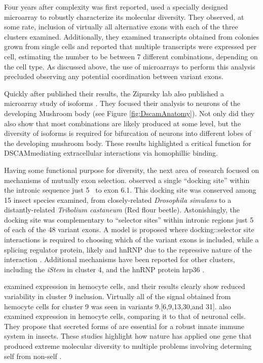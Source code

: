Four years after \dscam{} complexity was first reported, \citep{Neves2004} used a specially designed microarray to robustly characterize its molecular diversity. They observed, at some rate, inclusion of virtually all alternative exons with each of the three clusters examined. Additionally, they examined \dscam{} transcripts obtained from colonies grown from single cells and reported that multiple \dscam{} transcripts were expressed per cell, estimating the number to be between 7 different combinations, depending on the cell type. As discussed above, the use of microarrays to perform this analysis precluded observing any potential coordination between variant exons.

Quickly after \citet{Neves2004} published their results, the Zipursky lab also published a microarray study of \dscam{} isoforms \citep{Zhan2004}. They focused their analysis to neurons of the developing Mushroom body (see Figure \ref{fig:DscamAnatomy}). Not only did they also show that most \dscam{} combinations are likely produced at some level, but the diversity of isoforms is required for bifurcation of neurons into different lobes of the developing mushroom body. These results highlighted a critical function for DSCAM\textendash mediating extracellular interactions via homophillic binding.

Having some functional purpose for \dscam{} diversity, the next area of research focused on mechanisms of mutually exon selection. \citet{Graveley2005b} observed a single ``docking site'' within the intronic sequence just 5\textprime~ to exon 6.1. This docking site was conserved among 15 insect species examined, from closely-related \textit{Drosophila simulans} to a distantly-related \textit{Tribolium castaneum} (Red flour beetle). Astonishingly, the docking site was complementary to ``selector sites'' within intronic regions just 5\textprime~ of each of the 48 variant exons.  A model is proposed where docking::selector site interactions is required to choosing which of the variant exons is included, while a splicing regulator protein, likely and hnRNP due to the repressive nature of the interaction \citep{Graveley2000}. Additional mechanisms have been reported for other clusters, including the \textit{iStem} \citep{Kreahling2005} in cluster 4, and the hnRNP protein hrp36 \citep{Olson2007}.

\citep{Neves2004} examined \dscam{} expression in hemocyte cells, and their results clearly show reduced variability in cluster 9 inclusion. Virtually all of the signal obtained from hemocyte cells for cluster 9 was seen in variants 9.[6,9,13,30,and 31]. \citep{Watson2005} also examined \dscam{} expression in hemocyte cells, comparing it to that of neuronal cells. They propose that secreted forms of \dscam{} are essential for a robust innate immune system in insects. These studies highlight how nature has applied one gene that produced extreme molecular diversity to multiple problems involving determing self from non-self \citep{Shi2012a, Hattori2008}.

